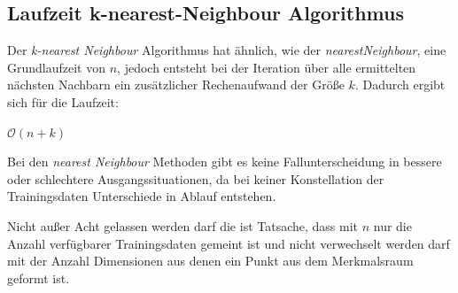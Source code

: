 \documentclass[fontsize=11pt]{scrartcl}
\begin{document}
            \subsection{Laufzeit k-nearest-Neighbour Algorithmus}
                Der \emph{k-nearest Neighbour} Algorithmus hat ähnlich, wie der \emph{nearestNeighbour}, eine Grundlaufzeit von $n$, jedoch entsteht bei der Iteration über alle ermittelten nächsten Nachbarn ein zusätzlicher Rechenaufwand der Größe $k$. Dadurch ergibt sich für die Laufzeit:\par
                \centering $\mathcal{O}(n+k)$\par
                Bei den \emph{nearest Neighbour} Methoden gibt es keine Fallunterscheidung in bessere oder schlechtere Ausgangssituationen, da bei keiner Konstellation der Trainingsdaten Unterschiede in Ablauf entstehen. \par
                Nicht außer Acht gelassen werden darf die ist Tatsache, dass mit $n$ nur die Anzahl verfügbarer Trainingsdaten gemeint ist und nicht verwechselt werden darf mit der Anzahl Dimensionen aus denen ein Punkt aus dem Merkmalsraum geformt ist. 


    
    
\end{document}
